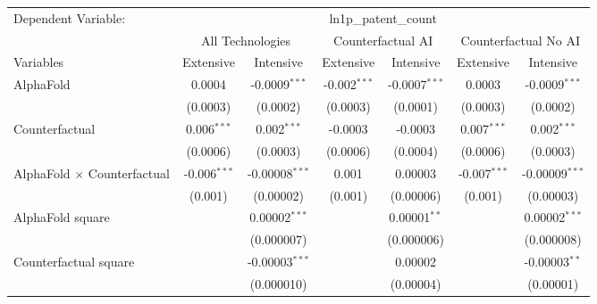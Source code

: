 \begingroup
\centering
\begin{tabular}{lcccccc}
   \tabularnewline \midrule \midrule
   Dependent Variable: & \multicolumn{6}{c}{ln1p\_patent\_count}\\
 & \multicolumn{2}{c}{All Technologies} & \multicolumn{2}{c}{Counterfactual AI} & \multicolumn{2}{c}{Counterfactual No AI} \\
\cmidrule(lr){1-1}\cmidrule(lr){2-3} \cmidrule(lr){4-5} \cmidrule(lr){6-7}
Variables & \multicolumn{1}{c}{Extensive} & \multicolumn{1}{c}{Intensive} & \multicolumn{1}{c}{Extensive} & \multicolumn{1}{c}{Intensive} & \multicolumn{1}{c}{Extensive} & \multicolumn{1}{c}{Intensive} \\
\cmidrule(lr){1-1}\cmidrule(lr){2-2} \cmidrule(lr){3-3} \cmidrule(lr){4-4} \cmidrule(lr){5-5} \cmidrule(lr){6-6} \cmidrule(lr){7-7}
   AlphaFold                          & 0.0004         & -0.0009$^{***}$    & -0.002$^{***}$ & -0.0007$^{***}$ & 0.0003         & -0.0009$^{***}$\\   
                                      & (0.0003)       & (0.0002)           & (0.0003)       & (0.0001)        & (0.0003)       & (0.0002)\\   
   Counterfactual                     & 0.006$^{***}$  & 0.002$^{***}$      & -0.0003        & -0.0003         & 0.007$^{***}$  & 0.002$^{***}$\\   
                                      & (0.0006)       & (0.0003)           & (0.0006)       & (0.0004)        & (0.0006)       & (0.0003)\\   
   AlphaFold $\times$ Counterfactual  & -0.006$^{***}$ & -0.00008$^{***}$   & 0.001          & 0.00003         & -0.007$^{***}$ & -0.00009$^{***}$\\   
                                      & (0.001)        & (0.00002)          & (0.001)        & (0.00006)       & (0.001)        & (0.00003)\\   
   AlphaFold square                   &                & 0.00002$^{***}$    &                & 0.00001$^{**}$  &                & 0.00002$^{***}$\\   
                                      &                & (0.000007)         &                & (0.000006)      &                & (0.000008)\\   
   Counterfactual square              &                & -0.00003$^{***}$   &                & 0.00002         &                & -0.00003$^{**}$\\   
                                      &                & (0.000010)         &                & (0.00004)       &                & (0.00001)\\   

\end{tabular}
